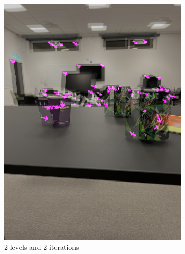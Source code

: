 \documentclass{article}
\begin{document}
    \begin{figure}[H]
        \centering
        \begin{subfigure}{0.48\textwidth}
            \centering
            \includegraphics[width=1\textwidth]{2levels-2iterations.png}
            \caption{2 levels  and 2 iterations}
            \label{fig:sub:flow-low-it-no-pyr}
        \end{subfigure}
        \hspace{5px}
        \begin{subfigure}{0.48\textwidth}
            \centering

\end{subfigure}
\end{figure}
\end{document}

